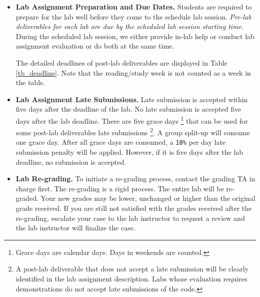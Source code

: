     \begin{itemize}
    \item {\bf Lab Assignment Preparation and Due Dates.}
        Students are required to prepare for the lab well 
        before they come to the schedule lab session. 
        {\em Pre-lab deliverables for each lab are due by the scheduled lab session starting time}.
        During the scheduled lab session, we either provide 
        in-lab help or conduct lab assignment evaluation 
        or do both at the same time. 
        
        The detailed deadlines of post-lab deliverables 
        are displayed in Table \ref{tb_deadline}. Note that the reading/study week is not counted as a week in the table. 
        
    \item {\bf Lab Assignment Late Submissions.} 
    	Late submission is accepted within five days after the deadline of the lab. 
    	No late submission is accepted five days after the lab deadline.
    	There are five grace days \footnote{Grace days are calendar days. Days in weekends are counted.}
        that can be used for some post-lab deliverables late submissions
        \footnote{A post-lab deliverable that does not accept a late submission 
        will be clearly identified in the lab assignment description. 
        Labs whose evaluation requires demonstrations do not accept late submissions
        of the code.}. 
        A group split-up will consume one grace day. 
        After all grace days are consumed, a \verb+10%+ per day late submission penalty will be applied.
        However, if it is five days after the lab deadline, no submission is accepted. 
        
    \item {\bf Lab Re-grading.}
    	To initiate a re-grading process, contact the grading TA in charge first. The re-grading is a rigid process. The entire lab will be re-graded. Your new grades may be lower, unchanged or higher than the original grade received. If you are still not satisfied with the grades received after the re-grading, escalate your case to the lab instructor to request a review and the lab instructor will finalize the case.
    \end{itemize}
